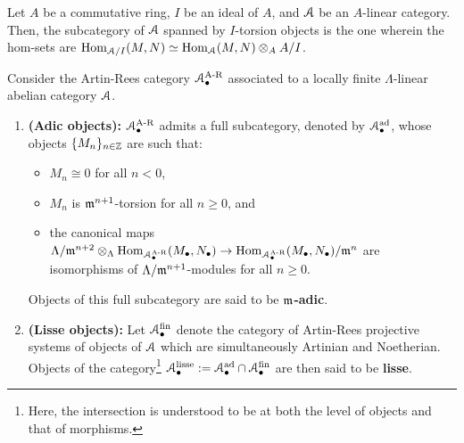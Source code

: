             \begin{definition} \label{def: torsion_objects_in_tensor_categories}
                Let $A$ be a commutative ring, $I$ be an ideal of $A$, and $\mathcal{A}$ be an $A$-linear category. Then, the subcategory of $\mathcal{A}$ spanned by $I$-torsion objects is the one wherein the hom-sets are $\Hom_{\calA/I}(M, N) \cong \Hom_\calA(M, N) \tensor_A A/I$.
            \end{definition}
            \begin{definition} \label{def: adic_objects_and_lisse_objects_of_artin_rees_categories}
                Consider the Artin-Rees category $\mathcal{A}_{\bullet}^{\mathrm{A\text{-}R}}$ associated to a locally finite $\Lambda$-linear abelian category $\mathcal{A}$. 
                    \begin{enumerate}
                        \item \textbf{(Adic objects):} $\mathcal{A}_{\bullet}^{\mathrm{A\text{-}R}}$ admits a full subcategory, denoted by $\mathcal{A}_{\bullet}^{\mathrm{ad}}$, whose objects $\{M_n\}_{n \in \mathbb{Z}}$ are such that:
                            \begin{itemize}
                                \item $M_n \cong 0$ for all $n < 0$,
                                \item $M_n$ is $\mathfrak{m}^{n + 1}$-torsion for all $n \geq 0$, and
                                \item the canonical maps $\Lambda/\m^{n + 2} \tensor_{\Lambda} \Hom_{\calA_{\bullet}^{\AR}}(M_{\bullet}, N_{\bullet}) \to \Hom_{\calA_{\bullet}^{\AR}}(M_{\bullet}, N_{\bullet})/\m^n$ are isomorphisms of $\Lambda/\mathfrak{m}^{n + 1}$-modules for all $n \geq 0$.
                            \end{itemize}
                        Objects of this full subcategory are said to be \textbf{$\mathfrak{m}$-adic}.
                        \item \textbf{(Lisse objects):} Let $\mathcal{A}_{\bullet}^{\mathrm{fin}}$ denote the category of Artin-Rees projective systems of objects of $\mathcal{A}$ which are simultaneously Artinian and Noetherian. Objects of the category\footnote{Here, the intersection is understood to be at both the level of objects and that of morphisms.} $\mathcal{A}_{\bullet}^{\mathrm{lisse}} := \mathcal{A}_{\bullet}^{\mathrm{ad}} \cap \mathcal{A}_{\bullet}^{\mathrm{fin}}$ are then said to be \textbf{lisse}. 
                    \end{enumerate}
            \end{definition}
